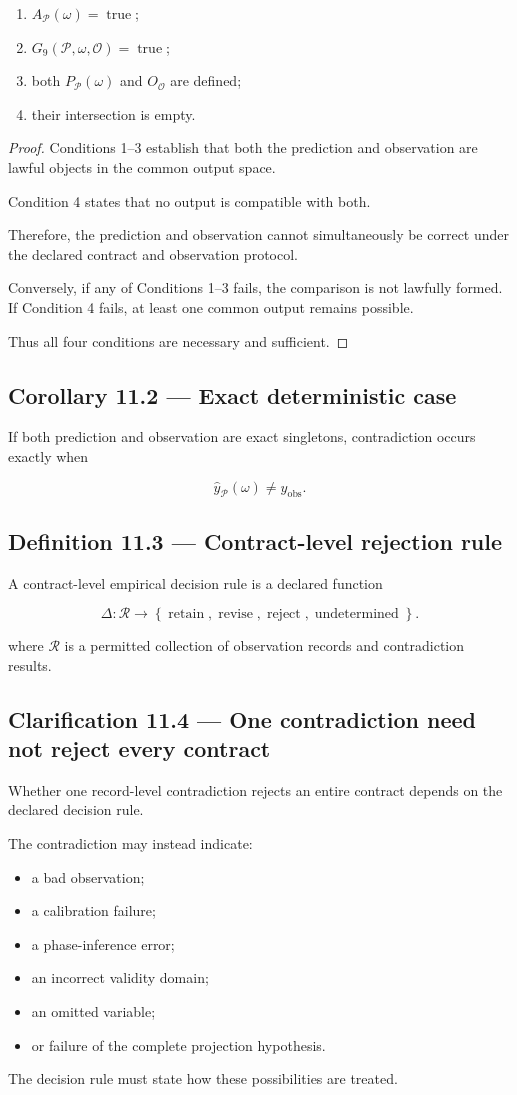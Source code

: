 \documentclass[11pt,oneside,openany]{book}
\newcommand{\PCsubsection}[1]{%
  \subsection*{#1}%
}
\begin{document}
\begin{enumerate}
\item \(A_{\mathcal P}(\omega)=\operatorname{true}\);
\item \(G_9(\mathcal P,\omega,\mathcal O)=\operatorname{true}\);
\item both \(P_{\mathcal P}(\omega)\) and \(O_{\mathcal O}\) are defined;
\item their intersection is empty.
\end{enumerate}
\begin{proof}
Conditions 1–3 establish that both the prediction and observation are lawful objects in the common output space.

Condition 4 states that no output is compatible with both.

Therefore, the prediction and observation cannot simultaneously be correct under the declared contract and observation protocol.

Conversely, if any of Conditions 1–3 fails, the comparison is not lawfully formed. If Condition 4 fails, at least one common output remains possible.

Thus all four conditions are necessary and sufficient.

\end{proof}

\PCsubsection{Corollary 11.2 --- Exact deterministic case}

If both prediction and observation are exact singletons, contradiction occurs exactly when

\[
\widehat y_{\mathcal P}(\omega) \neq y_{\mathrm{obs}}.
\]

\PCsubsection{Definition 11.3 --- Contract-level rejection rule}

A contract-level empirical decision rule is a declared function

\[
\boxed{ \Delta: \mathcal R \to \left\{ \operatorname{retain}, \operatorname{revise}, \operatorname{reject}, \operatorname{undetermined} \right\} }.
\]


where \(\mathcal R\) is a permitted collection of observation records and contradiction results.

\PCsubsection{Clarification 11.4 --- One contradiction need not reject every contract}

Whether one record-level contradiction rejects an entire contract depends on the declared decision rule.

The contradiction may instead indicate:

\begin{itemize}
\item a bad observation;
\item a calibration failure;
\item a phase-inference error;
\item an incorrect validity domain;
\item an omitted variable;
\item or failure of the complete projection hypothesis.
\end{itemize}
The decision rule must state how these possibilities are treated.
\end{document}
